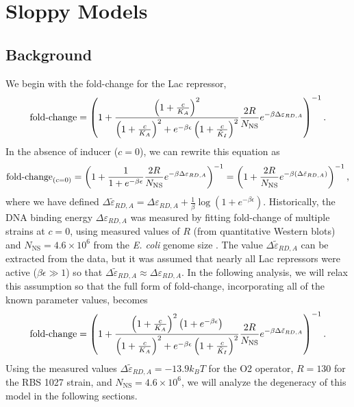 \pagebreak
\phantom{...}
\pagebreak
\section{Sloppy Models} \label{AppendixSloppiness}

\subsection{Background}

We begin with the fold-change for the Lac repressor,
\begin{equation}
\operatorname{fold-change}= \left(
1+\frac{\left(1+\frac{c}{K_A}\right)^2}{\left(1+\frac{c}{K_A}\right)^2+e^{-\beta \epsilon}\left(1 + \frac{c}{\tilde{K}_I}\right)^2}\frac{2 R}{N_{\text{NS}}}e^{-\beta \Delta\varepsilon_{RD,A}} \right)^{-1}.
\end{equation}
In the absence of inducer ($c = 0$), we can rewrite this equation as
\begin{equation}
\operatorname{fold-change}_{(c=0)}= \left(
1+\frac{1}{1+e^{-\beta \epsilon}}\frac{2 R}{N_{\text{NS}}}e^{-\beta \Delta\varepsilon_{RD,A}} \right)^{-1} = \left(
1+\frac{2 R}{N_{\text{NS}}}e^{-\beta \left( \Delta\tilde{\varepsilon}_{RD,A} \right) } \right)^{-1},
\end{equation}
where we have defined $\Delta\tilde{\varepsilon}_{RD,A} = \Delta\varepsilon_{RD,A} + \frac{1}{\beta} \log \left( 1 + e^{-\beta \epsilon} \right) $. Historically, the DNA binding energy $\Delta\varepsilon_{RD,A}$ was measured by fitting fold-change of multiple strains at $c = 0$, using measured values of $R$ (from quantitative Western blots) and $N_{\text{NS}} = 4.6
\times 10^6$ from the \textit{E. coli} genome size \cite{Garcia2011}. The value $\Delta\tilde{\varepsilon}_{RD,A}$ can be extracted from the data, but it was assumed that nearly all Lac repressors were active ($\beta \epsilon \gg 1$) so that $\Delta\tilde{\varepsilon}_{RD,A} \approx \Delta\varepsilon_{RD,A}$. In the following analysis, we will relax this assumption so that the full form of fold-change, incorporating all of the known parameter values, becomes
\begin{equation} \label{SIFullFoldChangeExpression}
\operatorname{fold-change}= \left(
1+\frac{\left(1+\frac{c}{K_A}\right)^2 \left( 1 + e^{-\beta \epsilon} \right)}{\left(1+\frac{c}{K_A}\right)^2+e^{-\beta \epsilon}\left(1 + \frac{c}{\tilde{K}_I}\right)^2}\frac{2 R}{N_{\text{NS}}}e^{-\beta \Delta\tilde{\varepsilon}_{RD,A}} \right)^{-1}.
\end{equation}
Using the measured values $\Delta\tilde{\varepsilon}_{RD,A} = -13.9 k_B T$ for
the O2 operator, $R=130$ for the RBS 1027 strain, and $N_{\text{NS}} = 4.6
\times 10^6$, we will analyze the degeneracy of this model in the following
sections.

